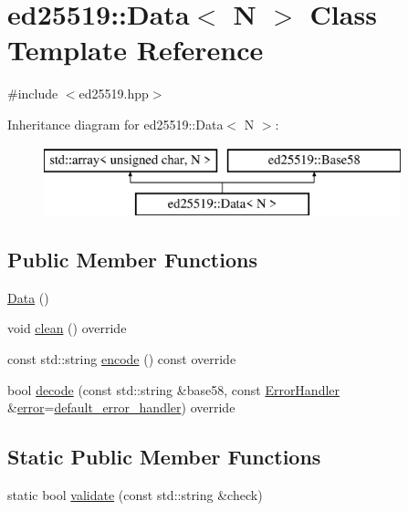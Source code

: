 \hypertarget{classed25519_1_1_data}{}\section{ed25519\+:\+:Data$<$ N $>$ Class Template Reference}
\label{classed25519_1_1_data}


{\ttfamily \#include $<$ed25519.\+hpp$>$}

Inheritance diagram for ed25519\+:\+:Data$<$ N $>$\+:\begin{figure}[H]
\begin{center}
\leavevmode
\includegraphics[height=2.000000cm]{classed25519_1_1_data}
\end{center}
\end{figure}
\subsection*{Public Member Functions}
\begin{DoxyCompactItemize}
\item 
\mbox{\hyperlink{classed25519_1_1_data_a2c637587095d6527cd4136926fb8b452}{Data}} ()
\item 
void \mbox{\hyperlink{classed25519_1_1_data_a22626c9e5a951dd673bfda8e78bf14fc}{clean}} () override
\item 
const std\+::string \mbox{\hyperlink{classed25519_1_1_data_a2dc2e23b950a10b168d7509a63ffca53}{encode}} () const override
\item 
bool \mbox{\hyperlink{classed25519_1_1_data_a281d932d3c3fe7fd40ce86ea7eff559b}{decode}} (const std\+::string \&base58, const \mbox{\hyperlink{namespaceed25519_a6ba572942b3c18591fc869d52a6b16e6}{Error\+Handler}} \&\mbox{\hyperlink{namespaceed25519_ac93d0b5156eaca22197055e902920bc4}{error}}=\mbox{\hyperlink{namespaceed25519_a7c7bb6ed17541162959c33ed3e3b15fb}{default\+\_\+error\+\_\+handler}}) override
\end{DoxyCompactItemize}
\subsection*{Static Public Member Functions}
\begin{DoxyCompactItemize}
\item 
static bool \mbox{\hyperlink{classed25519_1_1_data_a02609da44dcd8f0fa5812ecca0b84d21}{validate}} (const std\+::string \&check)
\end{DoxyCompactItemize}


